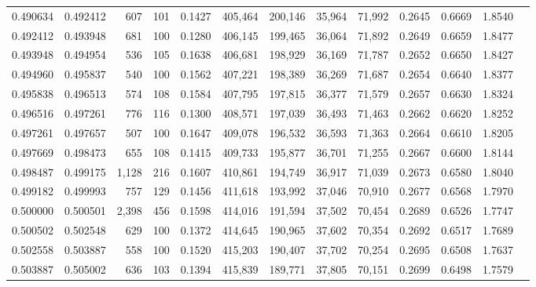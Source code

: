 \begin{tabular}{rrrrrrrrrrrrr}
0.490634 & 0.492412 &   607 & 101 &                                     0.1427 & 405,464 & 200,146 &  35,964 &  71,992 & 0.2645 & 0.6669 & 1.8540 \\
0.492412 & 0.493948 &   681 & 100 &                                     0.1280 & 406,145 & 199,465 &  36,064 &  71,892 & 0.2649 & 0.6659 & 1.8477 \\
0.493948 & 0.494954 &   536 & 105 &                                     0.1638 & 406,681 & 198,929 &  36,169 &  71,787 & 0.2652 & 0.6650 & 1.8427 \\
0.494960 & 0.495837 &   540 & 100 &                                     0.1562 & 407,221 & 198,389 &  36,269 &  71,687 & 0.2654 & 0.6640 & 1.8377 \\
0.495838 & 0.496513 &   574 & 108 &                                     0.1584 & 407,795 & 197,815 &  36,377 &  71,579 & 0.2657 & 0.6630 & 1.8324 \\
0.496516 & 0.497261 &   776 & 116 &                                     0.1300 & 408,571 & 197,039 &  36,493 &  71,463 & 0.2662 & 0.6620 & 1.8252 \\
0.497261 & 0.497657 &   507 & 100 &                                     0.1647 & 409,078 & 196,532 &  36,593 &  71,363 & 0.2664 & 0.6610 & 1.8205 \\
0.497669 & 0.498473 &   655 & 108 &                                     0.1415 & 409,733 & 195,877 &  36,701 &  71,255 & 0.2667 & 0.6600 & 1.8144 \\
0.498487 & 0.499175 & 1,128 & 216 &                                     0.1607 & 410,861 & 194,749 &  36,917 &  71,039 & 0.2673 & 0.6580 & 1.8040 \\
0.499182 & 0.499993 &   757 & 129 &                                     0.1456 & 411,618 & 193,992 &  37,046 &  70,910 & 0.2677 & 0.6568 & 1.7970 \\
0.500000 & 0.500501 & 2,398 & 456 &                                     0.1598 & 414,016 & 191,594 &  37,502 &  70,454 & 0.2689 & 0.6526 & 1.7747 \\
0.500502 & 0.502548 &   629 & 100 &                                     0.1372 & 414,645 & 190,965 &  37,602 &  70,354 & 0.2692 & 0.6517 & 1.7689 \\
0.502558 & 0.503887 &   558 & 100 &                                     0.1520 & 415,203 & 190,407 &  37,702 &  70,254 & 0.2695 & 0.6508 & 1.7637 \\
0.503887 & 0.505002 &   636 & 103 &                                     0.1394 & 415,839 & 189,771 &  37,805 &  70,151 & 0.2699 & 0.6498 & 1.7579 \\

\end{tabular}
